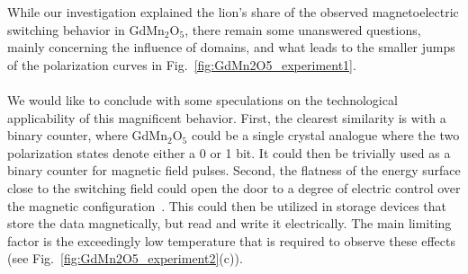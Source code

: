 While our investigation explained the lion's share of the observed magnetoelectric switching behavior in GdMn$_2$O$_5$, there remain some unanswered questions, mainly concerning the influence of domains, and what leads to the smaller jumps of the polarization curves in Fig.~\ref{fig:GdMn2O5_experiment1}.
\\\\
We would like to conclude with some speculations on the technological applicability of this magnificent behavior.
First, the clearest similarity is with a binary counter, where GdMn$_2$O$_5$ could be a single crystal analogue where the two polarization states denote either a 0 or 1 bit.
It could then be trivially used as a binary counter for magnetic field pulses.
Second, the flatness of the energy surface close to the switching field could open the door to a degree of electric control over the magnetic configuration~\cite{Radaelli08Y,Oh14}.
This could then be utilized in storage devices that store the data magnetically, but read and write it electrically.
The main limiting factor is the exceedingly low temperature that is required to observe these effects (see Fig.~\ref{fig:GdMn2O5_experiment2}(c)).
